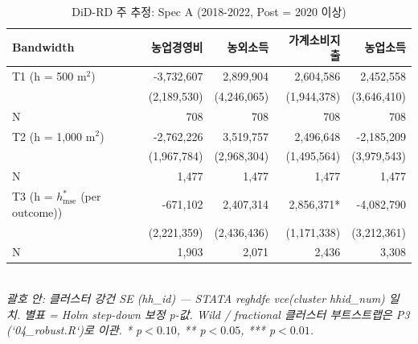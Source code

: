 \begin{table}[t]
\centering
\caption{DiD-RD 주 추정: Spec A (2018-2022, Post = 2020 이상)}
\label{tab:main_specA_ko}
\begin{tabular}{lrrrr}
\toprule
Bandwidth & 농업경영비 & 농외소득 & 가계소비지출 & 농업소득 \\
\midrule
T1 (h = 500 m$^2$) & -3,732,607 & 2,899,904 & 2,604,586 & 2,452,558 \\
        & (2,189,530) & (4,246,065) & (1,944,378) & (3,646,410) \\
N       & 708 & 708 & 708 & 708 \\
T2 (h = 1,000 m$^2$) & -2,762,226 & 3,519,757 & 2,496,648 & -2,185,209 \\
        & (1,967,784) & (2,968,304) & (1,495,564) & (3,979,543) \\
N       & 1,477 & 1,477 & 1,477 & 1,477 \\
T3 (h = $h^{*}_{\mathrm{mse}}$ (per outcome)) & -671,102 & 2,407,314 & 2,856,371* & -4,082,790 \\
        & (2,221,359) & (2,436,436) & (1,171,338) & (3,212,361) \\
N       & 1,903 & 2,071 & 2,436 & 3,308 \\
\bottomrule
\end{tabular}
\\
\footnotesize\textit{괄호 안: 클러스터 강건 SE (hh\_id) — STATA reghdfe vce(cluster hhid\_num) 일치. 별표 = Holm step-down 보정 p-값. Wild / fractional 클러스터 부트스트랩은 P3 (`04\_robust.R`)로 이관. * p$<0.10$, ** p$<0.05$, *** p$<0.01$.}
\end{table}

